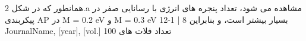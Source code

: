 همانطور که در شکل 2.a مشاهده می شود، تعداد پنجره های انرژی با رسانایی صفر در پیکربندی AP در M = 0.2 eV و M = 0.3 eV بسیار بیشتر است، و بنابراین 8 | 1-12 JournalName, [year], [vol.] تعداد فلات های 100%